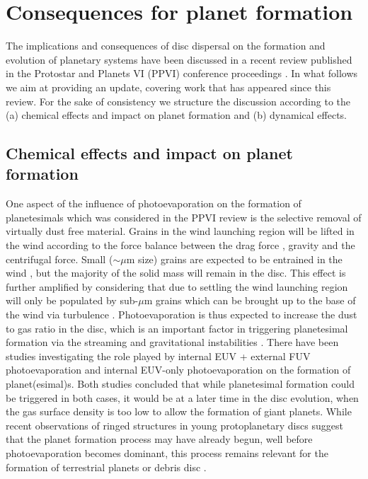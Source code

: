 \documentclass{rsos}
\begin{document}
\section{Consequences for planet formation}
\label{sect:implications}

The implications and consequences of disc  dispersal on the formation and evolution of planetary systems have been discussed in a recent review published in the Protostar and Planets VI (PPVI) conference proceedings \cite{2014prpl.conf..475A}. In what follows we aim at providing an update, covering work that has appeared since this review.  For the sake of consistency we structure the discussion  according to the (a) chemical effects and impact on planet formation and (b) dynamical effects. 

\subsection{Chemical effects and impact on planet formation}

One aspect of the influence of photoevaporation on the formation of planetesimals which was considered in the PPVI review is the selective removal of virtually dust free material. Grains in the wind launching region will be lifted in the wind according to the force balance between the drag force 
\cite{2005ApJ...627..286T}, gravity and the centrifugal force. Small ($\sim \mu$m size) grains are expected to be entrained in the wind 
\cite{2011MNRAS.411.1104O,2016MNRAS.463.2725H,2016MNRAS.461..742H}, but the majority of the solid mass  will remain in the disc. This effect is further amplified by considering that due to settling 
\cite{2005A&A...434..971D} the wind launching region will only be populated by sub-$\mu$m grains which can be brought up to the base of the wind via turbulence \cite{1995Icar..114..237D}. Photoevaporation is thus expected to increase the dust to gas ratio in the disc, which is an important factor in triggering planetesimal formation via the streaming and gravitational instabilities 
\cite{2010AREPS..38..493C}. There have been studies investigating the role played by internal EUV + external FUV photoevaporation \cite{2005ApJ...623L.149T} and internal EUV-only photoevaporation \cite{2007MNRAS.375..500A} on the formation of planet(esimal)s. Both studies concluded that while planetesimal formation could be triggered in both cases, it would be at a later time in the disc evolution, when the gas surface density is too low to allow the formation of giant planets. While recent observations of ringed structures in young protoplanetary discs suggest that the planet formation process may have already begun, well before photoevaporation becomes dominant,  this process remains relevant for the formation of terrestrial planets or debris disc  \cite{2008ARA&A..46..339W}. 
 
\end{document}

